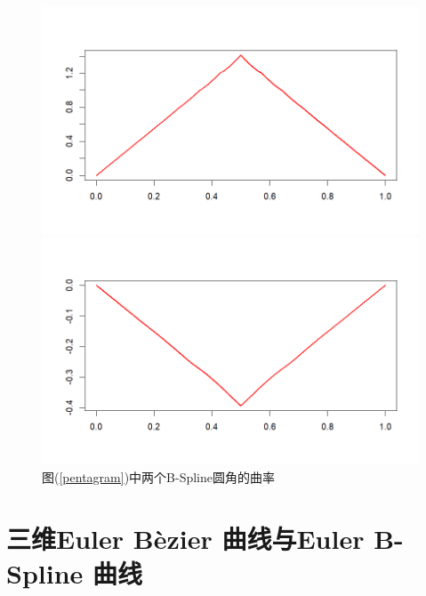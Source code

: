 \documentclass[utf8]{ctexart} %
\begin{document}
\begin{figure}
	\centering
	\begin{minipage}{0.49\linewidth}
		\centering
		\includegraphics[width=0.7\linewidth]{figures/Pentagram_B-Spline1.png}
	\end{minipage}
	\begin{minipage}{0.49\linewidth}
		\centering
		\includegraphics[width=0.7\linewidth]{figures/Pentagram_B-Spline2.png}
	\end{minipage}
\caption{\small{图(\ref{pentagram})中两个B-Spline圆角的曲率}}
\end{figure}
	 \section{三维Euler B\`{e}zier 曲线与Euler B-Spline 曲线}
\end{document}
